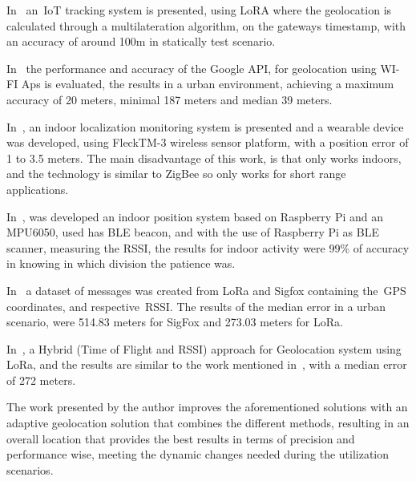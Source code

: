 In~\cite{Fargas2017RL1} an~\gls{IoT} tracking system is presented, using LoRA where the geolocation is calculated through a multilateration algorithm, on the gateways timestamp, with an accuracy of around 100m in statically test scenario.


In~\cite{RL3} the performance and accuracy of the Google API, for geolocation using WI-FI Aps is evaluated, the results in a urban environment, achieving a maximum accuracy of 20 meters, minimal 187 meters and median 39 meters.

In~\cite{DSouza2012RL4}, an  indoor localization monitoring system is presented and a wearable device was developed, using FleckTM-3 wireless sensor platform, with a position error of 1 to 3.5 meters. The main disadvantage of this work, is that only works indoors, and the technology is similar to ZigBee so only works for short range applications.

In~\cite{Tabbakha2018}, was developed an indoor position system based on Raspberry Pi and an MPU6050, used has BLE beacon, and with the use of Raspberry Pi as BLE scanner, measuring the RSSI, the results for indoor activity were 99\% of accuracy in knowing in which division the patience was.

In~\cite{Aernouts2018RL2} a dataset of messages was created from LoRa and Sigfox containing the~\gls{GPS} coordinates, and respective~\gls{RSSI}. The results of the median error in a urban scenario, were 514.83 meters for SigFox and 273.03 meters for LoRa.

In~\cite{Danebjer2018}, a Hybrid (Time of Flight and RSSI) approach for Geolocation system using LoRa,  and the results are similar to the work mentioned in~\cite{Aernouts2018RL2}, with a median error of 272 meters.

The work presented by the author improves the aforementioned solutions with an adaptive geolocation solution that combines the different methods, resulting in an overall location that provides the best results in terms of precision and performance wise, meeting the dynamic changes needed during the utilization scenarios.

